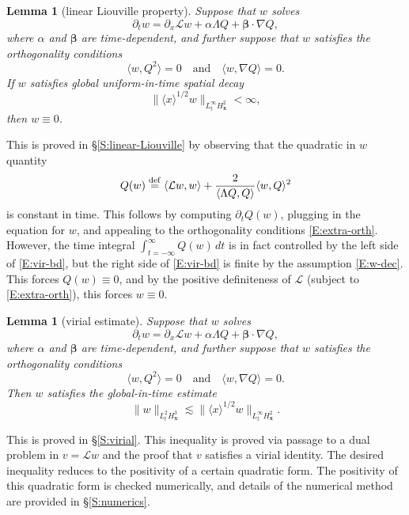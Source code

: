\documentclass[12pt,letterpaper]{amsart}
\newcommand{\la}{\langle}
\newcommand{\ra}{\rangle}
\newcommand{\defeq}{\stackrel{\rm{def}}{=}}
\newtheorem{lemma}[theorem]{Lemma}
\theoremstyle{remark}
\numberwithin{equation}{section}
\numberwithin{theorem}{section}
\numberwithin{table}{section}
\begin{document}
\begin{lemma}[linear Liouville property]
\label{L:linear-Liouville}
Suppose that $w$ solves
\begin{equation}
\label{E:w-eq}
\partial_t w =\partial_x \mathcal{L}w + \alpha \Lambda Q + \boldsymbol{\beta} \cdot \nabla Q,
\end{equation}
where $\alpha$ and $\boldsymbol{\beta}$ are time-dependent, and further suppose that $w$ satisfies the orthogonality conditions
\begin{equation}
\label{E:extra-orth}
\la w, Q^2 \ra =0 \quad \text{and} \quad \la w, \nabla Q \ra =0.
\end{equation}
If $w$ satisfies global uniform-in-time spatial decay
\begin{equation}
\label{E:w-dec}
\| \la x \ra^{1/2} w \|_{L_t^\infty H_{\mathbf{x}}^2} < \infty,
\end{equation}
then
$w\equiv 0$.
\end{lemma}

This is proved in \S \ref{S:linear-Liouville} by observing that the quadratic in $w$ quantity 
$$
Q(w) \defeq \la \mathcal{L}w,w \ra + \frac{2}{\la \Lambda Q, Q \ra} \la w, Q \ra^2
$$
is constant in time.  This follows by computing $\partial_t Q(w)$, plugging in the equation for $w$, and appealing to the orthogonality conditions \eqref{E:extra-orth}.  However, the time integral $\int_{t=-\infty}^{\infty} Q(w) \, dt$ is in fact controlled by the left side of \eqref{E:vir-bd}, but the right side of  \eqref{E:vir-bd} is finite by the assumption \eqref{E:w-dec}.  This forces $Q(w)\equiv 0$, and by the positive definiteness of $\mathcal{L}$ (subject to \eqref{E:extra-orth}), this forces $w\equiv 0$.

\begin{lemma}[virial estimate]
\label{L:virial}
Suppose that $w$ solves
$$
\partial_t w =\partial_x \mathcal{L}w + \alpha \Lambda Q + \boldsymbol{\beta} \cdot \nabla Q,
$$
where $\alpha$ and $\boldsymbol{\beta}$ are time-dependent, and further suppose that $w$ satisfies the orthogonality conditions
$$
\la w, Q^2 \ra =0 \quad \text{and} \quad \la w, \nabla Q \ra =0.
$$
Then $w$ satisfies the global-in-time estimate
\begin{equation}
\label{E:vir-bd}
\| w \|_{L_t^2 H_{\mathbf{x}}^3} \lesssim \| \la x \ra^{1/2} w \|_{L_t^\infty H_{\mathbf{x}}^2}.
\end{equation}
\end{lemma}

This is proved in \S \ref{S:virial}.  This inequality is proved via passage to a dual problem in $v=\mathcal{L}w$ and the proof that $v$ satisfies a virial identity.  The desired inequality reduces to the positivity of a certain quadratic form.  The positivity of this quadratic form is checked numerically, and details of the numerical method are provided in \S \ref{S:numerics}.
\end{document}
